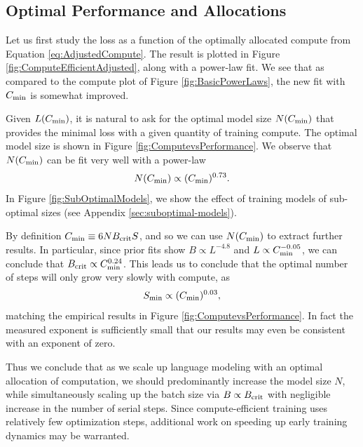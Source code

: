 \documentclass[english]{article}
\newcommand{\be}{\begin{equation}}
\newcommand{\ee}{\end{equation}}
\begin{document}
\subsection{Optimal Performance and Allocations}

Let us first study the loss as a function of the optimally allocated compute from Equation \eqref{eq:AdjustedCompute}.  The result is plotted in Figure \ref{fig:ComputeEfficientAdjusted}, along with a power-law fit.  We see that as compared to the compute plot of Figure \ref{fig:BasicPowerLaws}, the new fit with $C_{\rm min}$ is somewhat improved.  

Given $L(C_{\rm min})$, it is natural to ask for the optimal model size $N(C_{\rm min})$ that provides the minimal loss with a given quantity of training compute.  The optimal model size is shown in Figure \ref{fig:ComputevsPerformance}.  We observe that $N(C_{\rm min})$ can be fit very well with a power-law
\be
N(C_{\rm min}) \propto (C_{\rm min})^{0.73}.
\ee
In Figure \ref{fig:SubOptimalModels}, we show the effect of training models of sub-optimal sizes (see Appendix \ref{sec:suboptimal-models}).

By definition $C_{\rm min} \equiv 6 N B_{\rm crit} S$, and so we can use $N(C_{\rm min})$ to extract further results.  In particular, since prior fits show $B \propto L^{-4.8}$ and $L \propto C_{\rm min}^{-0.05}$, we can conclude that $B_{\rm crit} \propto C_{\rm min}^{0.24}$.  This leads us to conclude that the optimal number of steps will only grow very slowly with compute, as
\be
S_{\rm min} \propto (C_{\rm min})^{0.03},
\ee
matching the empirical results in Figure \ref{fig:ComputevsPerformance}.  In fact the measured exponent is sufficiently small that our results may even be consistent with an exponent of zero.  

Thus we conclude that as we scale up language modeling with an optimal allocation of computation, we should predominantly increase the model size $N$, while simultaneously scaling up the batch size  via $B \propto B_{\rm crit}$ with negligible increase in the number of serial steps.  Since compute-efficient training uses relatively few optimization steps, additional work on speeding up early training dynamics may be warranted.
\end{document}
